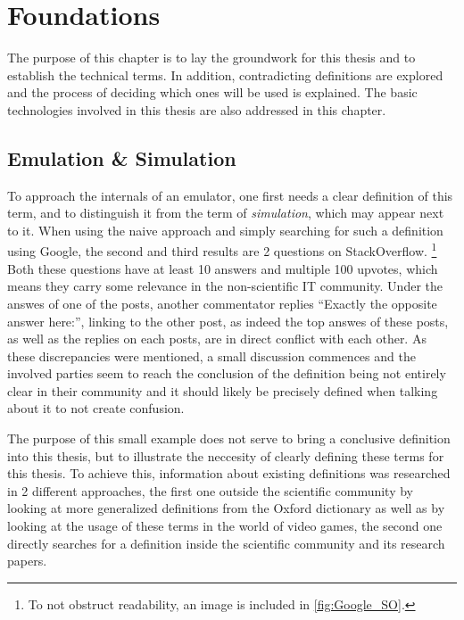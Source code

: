 \chapter{Foundations}
The purpose of this chapter is to lay the groundwork for this thesis
and to establish the technical terms.
In addition, contradicting definitions are explored
and the process of deciding which ones will be used is explained.
The basic technologies involved in this thesis are also addressed in this chapter.

\section{Emulation \& Simulation}
To approach the internals of an emulator, one first needs a clear definition of this term,
and to distinguish it from the term of \emph{simulation}, which may appear next to it.
When using the naive approach and simply searching for such a definition using Google,
the second and third results are 2 questions on StackOverflow\cite{SO_link}\cite{SO}.
\footnote{To not obstruct readability, an image is included in \autoref{fig:Google_SO}.}
Both these questions have at least 10 answers and multiple 100 upvotes,
which means they carry some relevance in the non-scientific IT community.
Under the answes of one of the posts, another commentator replies
\enquote{Exactly the opposite answer here:}\cite{SO_link},
linking to the other post\cite{SO},
as indeed the top answes of these posts, as well as the replies on each posts,
are in direct conflict with each other.
As these discrepancies were mentioned,
a small discussion commences and the involved parties seem to reach the conclusion
of the definition being not entirely clear in their community and it should likely be precisely defined when talking about it
to not create confusion.

The purpose of this small example does not serve to bring a conclusive definition into this thesis,
but to illustrate the neccesity of clearly defining these terms for this thesis.
To achieve this, information about existing definitions was researched in 2 different approaches,
the first one outside the scientific community by looking at more generalized definitions from the Oxford dictionary
as well as by looking at the usage of these terms in the world of video games,
the second one directly searches for a definition inside the scientific community and its research papers.

